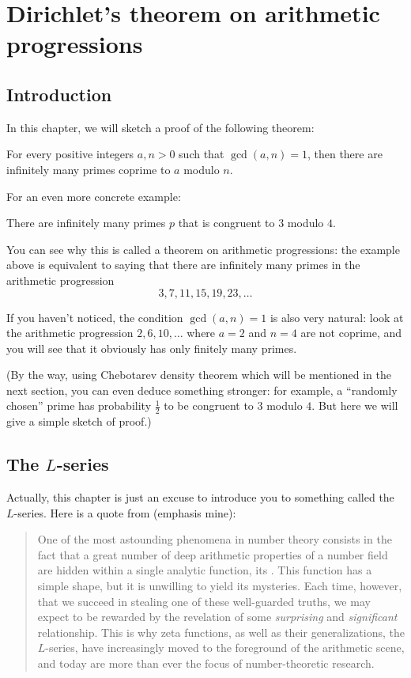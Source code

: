 \chapter{Dirichlet's theorem on arithmetic progressions}

\section{Introduction}

In this chapter, we will sketch a proof of the following theorem:
\begin{theorem}
	For every positive integers $a, n > 0$ such that $\gcd(a, n) = 1$, then there are infinitely
	many primes coprime to $a$ modulo $n$.
\end{theorem}

For an even more concrete example:
\begin{corollary}
There are infinitely many primes $p$ that is congruent to $3$ modulo $4$.
\end{corollary}

You can see why this is called a theorem on arithmetic progressions:
the example above is equivalent to saying that there are infinitely many primes in the arithmetic
progression
\[ 3, 7, 11, 15, 19, 23, \dots \]

If you haven't noticed, the condition $\gcd(a, n) = 1$ is also very natural:
look at the arithmetic progression $2, 6, 10, \dots$ where $a = 2$ and $n = 4$ are not coprime,
and you will see that it obviously has only finitely many primes.

(By the way, using Chebotarev density theorem which will be mentioned in the next section,
you can even deduce something stronger: for example, a ``randomly chosen'' prime has probability
$\frac{1}{2}$ to be congruent to $3$ modulo $4$. But here we will give a simple sketch of proof.)

\section{The $L$-series}

Actually, this chapter is just an excuse to introduce you to something called the $L$-series.
Here is a quote from \cite{ref:neukirch} (emphasis mine):

\begin{quote}
One of the most astounding phenomena in number theory consists in the
fact that a great number of deep arithmetic properties of a number field are
hidden within a single analytic function, its . This function has
a simple shape, but it is unwilling to yield its mysteries. Each time, however,
that we succeed in stealing one of these well-guarded truths, we may expect to
be rewarded by the revelation of some \emph{surprising} and \emph{significant} relationship.
This is why zeta functions, as well as their generalizations, the $L$-series,
have increasingly moved to the foreground of the arithmetic scene, and today
are more than ever the focus of number-theoretic research.
\end{quote}

